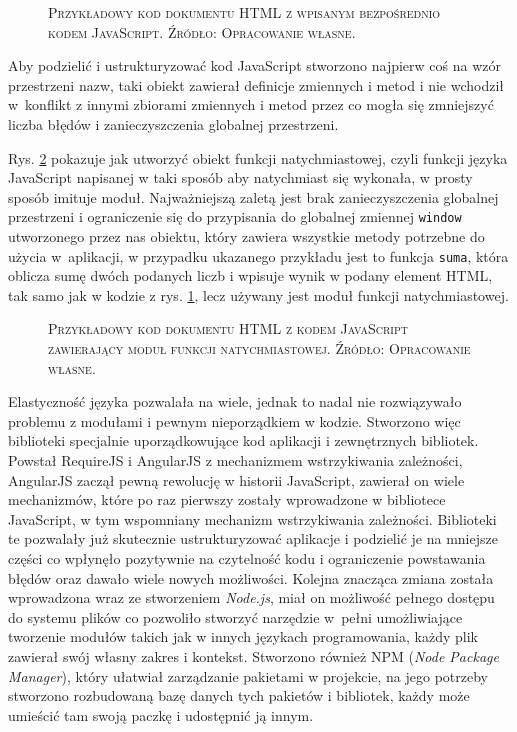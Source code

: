 \documentclass[12pt,a4paper,oneside]{book}
\newcommand{\captionT}[1]{\caption{\textsc{\footnotesize{#1}}}}
\begin{document}
\begin{figure}[H]
\centering

\captionT{Przykładowy kod dokumentu HTML z wpisanym bezpośrednio kodem JavaScript. Źródło: Opracowanie własne.}
\label{rys_basic_javascript}
\end{figure}

Aby podzielić i ustrukturyzować kod JavaScript stworzono najpierw coś na wzór przestrzeni nazw, taki obiekt zawierał definicje zmiennych i metod i nie wchodził w~konflikt z innymi zbiorami zmiennych i metod przez co mogła się zmniejszyć liczba błędów i zanieczyszczenia globalnej przestrzeni.

Rys. \ref{rys_iife_javascript} pokazuje jak utworzyć obiekt funkcji natychmiastowej, czyli funkcji języka JavaScript napisanej w taki sposób aby natychmiast się wykonała, w prosty sposób imituje moduł. Najważniejszą zaletą jest brak zanieczyszczenia globalnej przestrzeni i ograniczenie się do przypisania do globalnej zmiennej \texttt{window} utworzonego przez nas obiektu, który zawiera wszystkie metody potrzebne do użycia w~aplikacji, w przypadku ukazanego przykładu jest to funkcja \texttt{suma}, która oblicza sumę dwóch podanych liczb i wpisuje wynik w podany element HTML, tak samo jak w kodzie z rys. \ref{rys_basic_javascript}, lecz używany jest moduł funkcji natychmiastowej.

\begin{figure}[H]
\centering

\captionT{Przykładowy kod dokumentu HTML z kodem JavaScript zawierający moduł funkcji natychmiastowej. Źródło: Opracowanie własne.}
\label{rys_iife_javascript}
\end{figure}

Elastyczność języka pozwalała na wiele, jednak to nadal nie rozwiązywało problemu z modułami i pewnym nieporządkiem w kodzie. Stworzono więc biblioteki specjalnie uporządkowujące kod aplikacji i zewnętrznych bibliotek. Powstał RequireJS i AngularJS z mechanizmem wstrzykiwania zależności, AngularJS zaczął pewną rewolucję w historii JavaScript, zawierał on wiele mechanizmów, które po raz pierwszy zostały wprowadzone w bibliotece JavaScript, w tym wspomniany mechanizm wstrzykiwania zależności. Biblioteki te pozwalały już skutecznie ustrukturyzować aplikacje i podzielić je na mniejsze części co wpłynęło pozytywnie na czytelność kodu i ograniczenie powstawania błędów oraz dawało wiele nowych możliwości. Kolejna znacząca zmiana została wprowadzona wraz ze stworzeniem \textit{Node.js}, miał on możliwość pełnego dostępu do systemu plików co pozwoliło stworzyć narzędzie w~pełni umożliwiające tworzenie modułów takich jak w innych językach programowania, każdy plik zawierał swój własny zakres i kontekst. Stworzono również NPM (\textit{Node Package Manager}), który ułatwiał zarządzanie pakietami w projekcie, na jego potrzeby stworzono rozbudowaną bazę danych tych pakietów i bibliotek, każdy może umieścić tam swoją paczkę i udostępnić ją innym.
\end{document}
